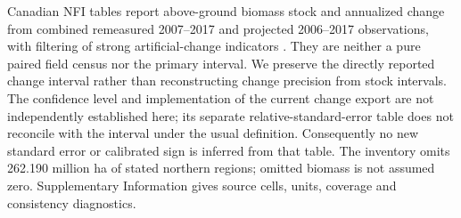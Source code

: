 Canadian NFI tables report above-ground biomass stock and annualized change from combined remeasured 2007--2017 and projected 2006--2017 observations, with filtering of strong artificial-change indicators \citep{CanadaNFI2025}. They are neither a pure paired field census nor the primary interval. We preserve the directly reported change interval rather than reconstructing change precision from stock intervals. The confidence level and implementation of the current change export are not independently established here; its separate relative-standard-error table does not reconcile with the interval under the usual definition. Consequently no new standard error or calibrated sign is inferred from that table. The inventory omits 262.190 million ha of stated northern regions; omitted biomass is not assumed zero. Supplementary Information gives source cells, units, coverage and consistency diagnostics.
